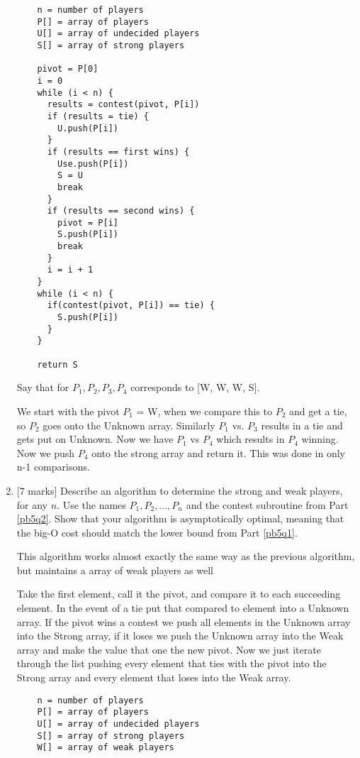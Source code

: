 \documentclass[12pt]{article}
\begin{document}
\begin{enumerate}
  \begin{verbatim}
    n = number of players
    P[] = array of players
    U[] = array of undecided players
    S[] = array of strong players

    pivot = P[0]
    i = 0
    while (i < n) {
      results = contest(pivot, P[i])
      if (results = tie) {
        U.push(P[i])
      }
      if (results == first wins) {
        Use.push(P[i])
        S = U
        break
      }
      if (results == second wins) {
        pivot = P[i]
        S.push(P[i])
        break
      }
      i = i + 1
    }
    while (i < n) {
      if(contest(pivot, P[i]) == tie) {
        S.push(P[i])
      }
    }

    return S

  \end{verbatim}

  Say that for $P_1, P_2, P_3, P_4$ corresponds to [W, W, W, S].

  We start with the pivot $P_1$ = W, when we compare this to $P_2$ and get a tie, so $P_2$ goes onto the Unknown array. Similarly $P_1$ vs. $P_3$ results in a tie and gets put on Unknown. Now we have $P_1$ vs $P_4$ which results in $P_4$ winning. Now we push $P_4$ onto the strong array and return it. This was done in only n-1 comparisons.

  \item {[}7 marks] Describe an algorithm to determine the strong and weak
  players, for any $n$. Use the names $P_1, P_2, \ldots, P_n$ and the contest
  subroutine from Part \ref{pb5q2}. Show that your algorithm is asymptotically
  optimal, meaning that the big-O cost should match the lower bound from Part
  \ref{pb5q1}.

  This algorithm works almost exactly the same way as the previous algorithm, but maintains a array of weak players as well

  Take the first element, call it the pivot, and compare it to each succeeding element. In the event of a tie put that compared to element into a Unknown array. If the pivot wins a contest we push all elements in the Unknown array into the Strong array, if it loses we push the Unknown array into the Weak array and make the value that one the new pivot. Now we just iterate through the list pushing every element that ties with the pivot into the Strong array and every element that loses into the Weak array.

  \begin{verbatim}
    n = number of players
    P[] = array of players
    U[] = array of undecided players
    S[] = array of strong players
    W[] = array of weak players


\end{verbatim}
\end{enumerate}
\end{document}
